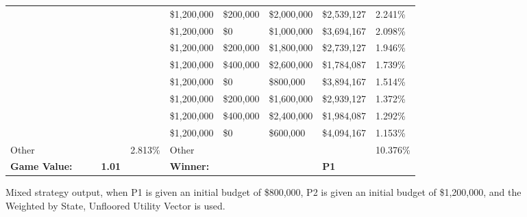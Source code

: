 \documentclass[11pt]{article}
\begin{document}
\begin{figure}
\begin{tabular}{ |p{1.0cm}p{1.0cm}p{1.0cm}p{2.0cm}|p{1.0cm}||p{1.0cm}p{1.0cm}p{1.0cm}p{2.0cm}|p{1.0cm}|}
&  &  &  &  & \$1,200,000 & \$200,000 & \$2,000,000 & \$2,539,127 & 2.241\% \\
&  &  &  &  & \$1,200,000 & \$0 & \$1,000,000 & \$3,694,167 & 2.098\% \\
&  &  &  &  & \$1,200,000 & \$200,000 & \$1,800,000 & \$2,739,127 & 1.946\% \\
&  &  &  &  & \$1,200,000 & \$400,000 & \$2,600,000 & \$1,784,087 & 1.739\% \\
&  &  &  &  & \$1,200,000 & \$0 & \$800,000 & \$3,894,167 & 1.514\% \\
&  &  &  &  & \$1,200,000 & \$200,000 & \$1,600,000 & \$2,939,127 & 1.372\% \\
&  &  &  &  & \$1,200,000 & \$400,000 & \$2,400,000 & \$1,984,087 & 1.292\% \\
&  &  &  &  & \$1,200,000 & \$0 & \$600,000 & \$4,094,167 & 1.153\% \\
\hline
Other &  &  &  & 2.813\% & Other &  &  &  & 10.376\% \\
\hline
\small \textbf{Game Value:} &&& \small \textbf{1.01} && \small \textbf{Winner:} &&& \small \textbf{P1}&\\
\hline
\end{tabular}
\caption{Mixed strategy output, when P1 is given an initial budget of \$800,000, P2 is given an initial budget of \$1,200,000, and the Weighted by State, Unfloored Utility Vector is used.}
\label{8v12table.5}
\end{figure}
\end{document}
